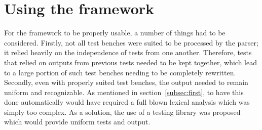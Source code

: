 \documentclass[11pt,british]{article}
\begin{document}
\newpage{}
\section{Using the framework}
\label{sec:using}
For the framework to be properly usable, a number of things had to be considered. Firstly, not all test benches were suited to be processed by the parser; it relied heavily on the independence of tests from one another. Therefore, tests that relied on outputs from previous tests needed to be kept together, which lead to a large portion of such test benches needing to be completely rewritten.
\\[\baselineskip]
Secondly, even with properly suited test benches, the output needed to remain uniform and recognizable. As mentioned in section~\ref{subsec:first}, to have this done automatically would have required a full blown lexical analysis which was simply too complex. As a solution, the use of a testing library was proposed which would provide uniform tests and output.
\end{document}
